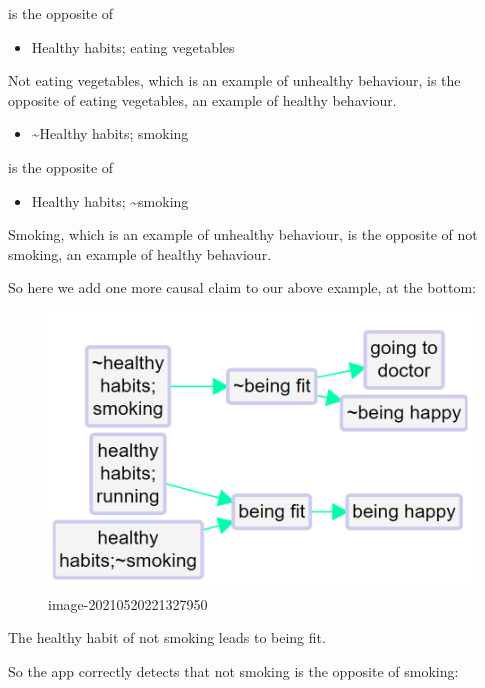\documentclass[
]{book}
\providecommand{\tightlist}{%
  \setlength{\itemsep}{0pt}\setlength{\parskip}{0pt}}
\begin{document}
is the opposite of

\begin{itemize}
\tightlist
\item
  Healthy habits; eating vegetables
\end{itemize}

Not eating vegetables, which is an example of unhealthy behaviour, is the opposite of eating vegetables, an example of healthy behaviour.

\begin{itemize}
\tightlist
\item
  \textasciitilde Healthy habits; smoking
\end{itemize}

is the opposite of

\begin{itemize}
\tightlist
\item
  Healthy habits; \textasciitilde smoking
\end{itemize}

Smoking, which is an example of unhealthy behaviour, is the opposite of not smoking, an example of healthy behaviour.

So here we add one more causal claim to our above example, at the bottom:

\begin{figure}
\centering
\includegraphics[width=6.77083in,height=\textheight]{_assets/image-20210520221327950.png}
\caption{image-20210520221327950}
\end{figure}

The healthy habit of not smoking leads to being fit.

So the app correctly detects that not smoking is the opposite of smoking:
\end{document}
